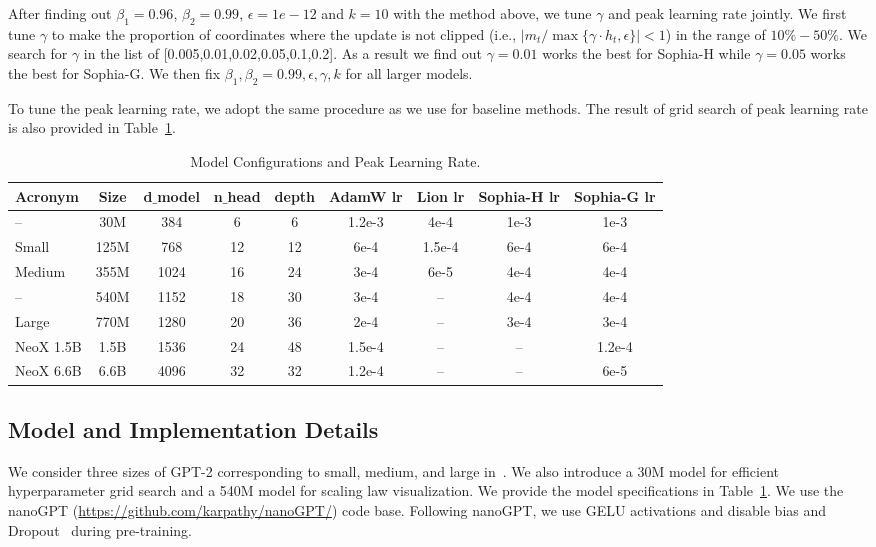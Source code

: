 After finding out $\beta_1=0.96$, $\beta_2=0.99$, $\epsilon =1e-12$ and $k=10$ with the method above, we tune $\gamma$ and peak learning rate jointly. We first tune $\gamma$ to make the proportion of coordinates where the update is not clipped (i.e., $|m_t / \max\{\gamma \cdot h_t,\epsilon\}| < 1$) in the range of $10\%-50\%$. We search for $\gamma$ in the list of [0.005,0.01,0.02,0.05,0.1,0.2]. As a result we find out $\gamma = 0.01$ works the best for Sophia-H while $\gamma = 0.05$ works the best for Sophia-G. We then fix $\beta_1, \beta_2=0.99, \epsilon, \gamma, k$ for all larger models. 

To tune the peak learning rate, we adopt the same procedure as we use for baseline methods. The result of grid search of peak learning rate is also provided in Table~\ref{table3}. 
\begin{table}
\vspace{-20pt}
	\centering
	\caption{\small Model Configurations and Peak Learning Rate.}
	\label{table3}
	\begin{small}
 \addtolength{\tabcolsep}{-3pt} 
	\begin{tabular}{l|c|c|c|c|c|c|c|c}
	\toprule
	Acronym & Size & d$\_$model & n$\_$head & depth & AdamW lr & Lion lr & Sophia-H lr & Sophia-G lr\\
	\midrule
-- & 30M & 384 & 6 & 6 & 1.2e-3 & 4e-4 & 1e-3 & 1e-3 \\
Small & 125M & 768 & 12 & 12 & 6e-4 & 1.5e-4 & 6e-4 & 6e-4\\
Medium & 355M & 1024 & 16 & 24 & 3e-4 & 6e-5 & 4e-4 & 4e-4\\
-- & 540M & 1152 & 18 & 30 & 3e-4 & -- & 4e-4 & 4e-4\\
Large & 770M & 1280 & 20 & 36 & 2e-4 & -- & 3e-4 & 3e-4\\
NeoX 1.5B & 1.5B & 1536 & 24 & 48 & 1.5e-4 & -- & -- & 1.2e-4\\
NeoX 6.6B & 6.6B & 4096 & 32 & 32 & 1.2e-4 & -- & -- & 6e-5\\
 \bottomrule
	\end{tabular}
	\end{small}
	\vspace{-5pt}
\end{table}

\subsection{Model and Implementation Details}\label{sec:imp_detail}
We consider three sizes of GPT-2 corresponding to small, medium, and large in~\citet{radford2019language}. We also introduce a 30M model for efficient hyperparameter grid search and a 540M model for scaling law visualization. We provide the model specifications in Table~\ref{table3}. We use the nanoGPT (\url{https://github.com/karpathy/nanoGPT/}) code base. Following nanoGPT, we use GELU activations and disable bias and Dropout~\cite{srivastava2014dropout} during pre-training.  

